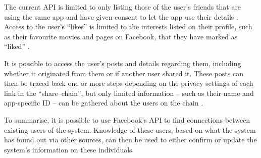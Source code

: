 The current \ac{API} is limited to only listing those of the user's friends
that are using the same app and have given consent to let the app use their
details \citep{FacebookChangesInGraphTwoPointOh}. Access to the user's ``likes''
is limited to the interests listed on their profile, such as their favourite
movies and pages on Facebook, that they have marked as ``liked''
\citep{FacebookGraphApiUserEdges, FacebookGraphApiUserLikes}.

It is possible to access the user's posts and details regarding them, including
whether it originated from them or if another user shared it. These posts can
then be traced back one or more steps depending on the privacy settings of each
link in the ``share--chain'', but only limited information -- such as their
name and app-specific ID -- can be gathered about the users on the chain
\citep{FacebookGraphApiUserFeed}.\nl

To summarise, it is possible to use Facebook's \ac{API} to find connections
between existing users of the system. Knowledge of these users, based on what
the system has found out via other sources, can then be used to either confirm
or update the system's information on these individuals.